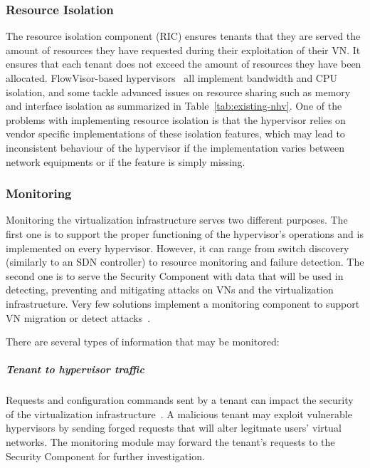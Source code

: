 \subsubsection{Resource Isolation}
The resource isolation component (RIC) ensures tenants that they are served the amount of resources they have requested during their exploitation of their VN.
It ensures that each tenant does not exceed the amount of resources they have been allocated.
FlowVisor-based hypervisors~\cite{FlowVisor-Sherwood2009,ADVisor-Salvadori2012,VeRTIGO-Corin2012a,EnhancedFV-Min2012,SlicesIsolator-El-Azzab2011,DoubleFV-Yin2013} all implement bandwidth and CPU isolation, and some tackle advanced issues on resource sharing such as memory and interface isolation as summarized in Table~\ref{tab:existing-nhv}. One of the problems with implementing resource isolation is that the hypervisor relies on vendor specific implementations of these isolation features, which may lead to inconsistent behaviour of the hypervisor if the implementation varies between network equipments or if the feature is simply missing.


\subsubsection{Monitoring}
Monitoring the virtualization infrastructure serves two different purposes.
The first one is to support the proper functioning of the hypervisor's operations and is implemented on every hypervisor. However, it can range from switch discovery (similarly to an SDN controller) to resource monitoring and failure detection.
The second one is to serve the Security Component with data that will be used in detecting, preventing and mitigating attacks on VNs and the virtualization infrastructure.
Very few solutions implement a monitoring component to support VN migration or detect attacks~\cite{VeRTIGO-Corin2012a,CoVisor-Jin2015,FlowN-Drutskoy2012,AutoSlice-Bozakov2012,NVP-Koponen2014,ONVisor-Han2018}.

There are several types of information that may be monitored:

\subparagraph{Tenant to hypervisor traffic} Requests and configuration commands sent by a tenant can impact the security of the virtualization infrastructure~\cite{You2014,Costa2015}. A malicious tenant may exploit vulnerable hypervisors by sending forged requests that will alter legitmate users' virtual networks. The monitoring module may forward the tenant's requests to the Security Component for further investigation.

